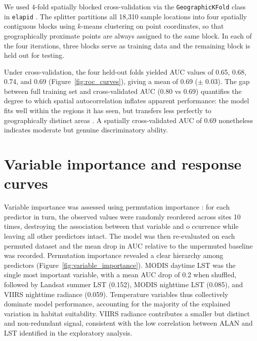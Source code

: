 \documentclass[11pt, a4paper, twocolumn]{article}
\begin{document}
We used 4-fold spatially blocked cross-validation 
via the \texttt{GeographicKFold} class in \texttt{elapid} \citep{Valavi2019}. 
The splitter partitions all 18,310 sample locations into four spatially 
contiguous blocks using $k$-means clustering on point coordinates, so that geographically proximate 
points are always assigned to the same block. In each of the four iterations, 
three blocks serve as training data and the remaining block is held out for testing. 

Under cross-validation, 
the four held-out folds yielded AUC values of 0.65, 0.68, 0.74, and 0.69 (Figure~\ref{fig:roc_curves}), 
giving a mean of 0.69 ($\pm$ 0.03). The gap between full training set and cross-validated AUC (0.80 vs 0.69) 
quantifies the degree to which spatial autocorrelation inflates apparent performance: 
the model fits well within the regions it has seen, but transfers less perfectly to geographically distinct 
areas \citep{Roberts2017}. A spatially cross-validated AUC of 0.69 nonetheless indicates moderate 
but genuine discriminatory ability.

\section{Variable importance and response curves}
Variable importance was assessed using permutation importance \citep{Elith2011}: for each predictor in turn, 
the observed values were randomly reordered across sites 10 times, destroying the association between that variable and o
ccurrence while leaving all other predictors intact. 
The model was then re-evaluated on each permuted dataset and the mean drop in AUC relative to the unpermuted baseline was recorded. 
Permutation importance revealed a clear hierarchy among predictors (Figure~\ref{fig:variable_importance}).
 MODIS daytime LST was the single most important variable, with a mean AUC drop of 0.2 when shuffled, followed by Landsat summer LST (0.152), MODIS nighttime LST (0.085), and VIIRS nighttime radiance (0.059). Temperature variables thus collectively dominate model performance, accounting for the majority of the explained variation in habitat suitability. VIIRS radiance contributes a smaller but distinct and non-redundant signal, consistent with the low correlation between ALAN and LST identified in the exploratory analysis.
\end{document}
